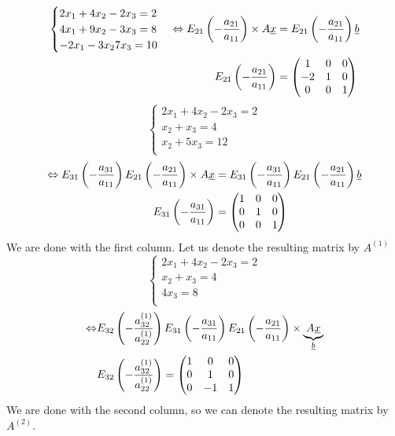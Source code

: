 \begin{example}
\begin{align*}
\begin{cases}
2x_1 + 4x_2-2x_3 = 2\\
4x_1 +9x_2 -3x_3 = 8\\
-2x_1 -3x_2 7x_3 = 10\\	
\end{cases}
\Leftrightarrow E_{21}\left( -\frac{a_{21}}{a_{11}}\right)\times A\underline{x} &= E_{21}\left( -\frac{a_{21}}{a_{11}}\right)\underline{b}\\
E_{21}\left( -\frac{a_{21}}{a_{11}}\right) &= \begin{pmatrix}
1 & 0 & 0\\
-2 & 1 & 0\\
0 & 0 & 1
\end{pmatrix}
\end{align*}
\[
\begin{cases}
2x_1 + 4x_2-2x_3 = 2\\
x_2+x_3= 4\\
x_2+5x_3=12\\	
\end{cases}
\]
\begin{align*}
\Leftrightarrow E_{31}\left( -\frac{a_{31}}{a_{11}}\right)E_{21}\left( -\frac{a_{21}}{a_{11}}\right)\times A\underline{x} &= E_{31}\left( -\frac{a_{31}}{a_{11}}\right)E_{21}\left( -\frac{a_{21}}{a_{11}}\right)\underline{b}\\
E_{31}\left( -\frac{a_{31}}{a_{11}}\right) &= \begin{pmatrix}
1 & 0 & 0\\
0 & 1 & 0\\
0 & 0 & 1
\end{pmatrix}
\end{align*}
We are done with the first column. Let us denote the resulting matrix by $A^{(1)}$
\[
\begin{cases}
2x_1 + 4x_2-2x_3 = 2\\
x_2+x_3= 4\\
4x_3 = 8\\	
\end{cases}
\]
\begin{align*}
\Leftrightarrow &E_{32}\left( -\frac{a_{32}^{(1)}}{a_{22}^{(1)}}\right)E_{31}\left( -\frac{a_{31}}{a_{11}}\right)E_{21}\left( -\frac{a_{21}}{a_{11}}\right)\times \underbrace{A\underline{x}}_{\underline{b}}\\
&E_{32}\left( -\frac{a_{32}^{(1)}}{a_{22}^{(1)}}\right) = \begin{pmatrix}
1 & 0 & 0\\
0 & 1 & 0\\
0 & -1 & 1
\end{pmatrix}
\end{align*}
We are done with the second column, so we can denote the resulting matrix by $A^{(2)}$.\\


\end{example}
